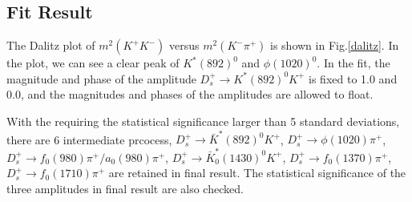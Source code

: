 \subsection{Fit Result}
\par{
    The Dalitz plot of $m^{2}(K^{+}K^{-})$ versus $m^{2}(K^{-}\pi^{+})$ is shown in Fig.\ref{dalitz}. In the plot, we can see a clear peak of $K^{*}(892)^{0}$ and $\phi(1020)^{0}$. 
In the fit, the magnitude and phase of the amplitude $D_{s}^{+} \rightarrow K^{*}(892)^{0}K^{+}$ is fixed to 1.0 and 0.0, and the magnitudes and phases of the amplitudes are allowed to float. 


With the requiring the statistical significance larger than 5 standard deviations, there are 6 intermediate prcocess, 
$D_{s}^{+} \rightarrow \bar{K}^{*}(892)^{0}K^{+}$,
$D_{s}^{+} \rightarrow \phi(1020)\pi^{+}$,
$D_{s}^{+} \rightarrow f_{0}(980)\pi^{+}/a_{0}(980)\pi^{+}$,
$D_{s}^{+} \rightarrow \bar{K}^{*}_{0}(1430)^{0}K^{+}$,
$D_{s}^{+} \rightarrow f_{0}(1370)\pi^{+}$,
$D_{s}^{+} \rightarrow f_{0}(1710)\pi^{+}$ 
are retained in final result. The statistical significance of the three amplitudes in final result are also checked.

}
